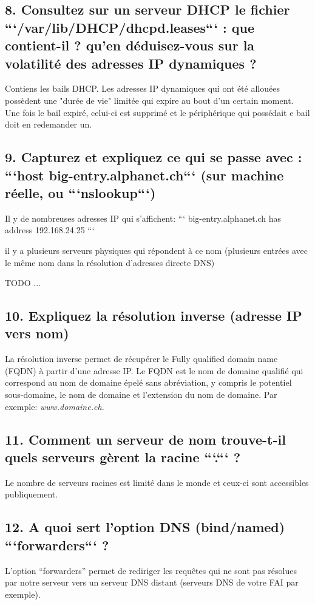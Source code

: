 \documentclass{article}
\begin{document}
\subsection*{8. Consultez sur un serveur DHCP le fichier ```/var/lib/DHCP/dhcpd.leases``` : que contient-il ? qu’en déduisez-vous sur la volatilité des adresses IP dynamiques ?}
Contiens les bails DHCP. Les adresses IP dynamiques qui ont été allouées possèdent une "durée de vie" limitée qui expire au bout d'un certain moment. Une fois le bail expiré, celui-ci est supprimé et le périphérique qui possédait e bail doit en redemander un.

\subsection*{9. Capturez et expliquez ce qui se passe avec : ```host big-entry.alphanet.ch``` (sur machine réelle, ou ```nslookup```)}
Il y de nombreuses adresses IP qui s'affichent:
```
big-entry.alphanet.ch has address 192.168.24.25
```

il y a plusieurs serveurs physiques qui répondent à ce nom (plusieurs entrées avec le même nom dans la résolution d'adresses directe DNS)

TODO ...

\subsection*{10. Expliquez la résolution inverse (adresse IP vers nom)}
La résolution inverse permet de récupérer le Fully qualified domain name (FQDN) à partir d'une adresse IP. Le FQDN est le nom de domaine qualifié qui correspond au nom de domaine épelé sans abréviation, y compris le potentiel sous-domaine, le nom de domaine et l'extension du nom de domaine. Par exemple:
\textit{www.domaine.ch.}

\subsection*{11. Comment un serveur de nom trouve-t-il quels serveurs gèrent la racine ```.``` ?}
Le nombre de serveurs racines est limité dans le monde et ceux-ci sont accessibles publiquement.

\subsection*{12. A quoi sert l’option DNS (bind/named) ```forwarders``` ?}
L'option “forwarders” permet de rediriger les requêtes qui ne sont pas résolues par notre serveur vers un serveur DNS distant (serveurs DNS de votre FAI par exemple).
\end{document}
